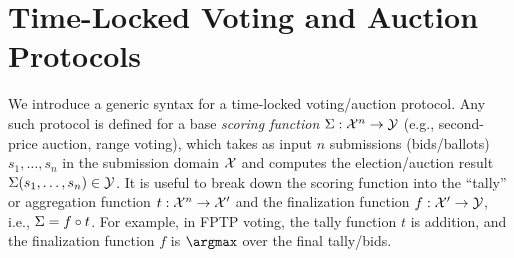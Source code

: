 \section{Time-Locked Voting and Auction Protocols}\label{sec:syntax}

We introduce a generic syntax for a time-locked voting/auction protocol. Any such protocol is defined for a base \emph{scoring function} $\Sigma: \mathcal{X}^n \to \mathcal{Y}$ (e.g., second-price auction, range voting), which takes as input $n$ submissions (bids/ballots) $s_1, \dots, s_n$ in the submission domain $\mathcal{X}$ and computes the election/auction result $\Sigma(s_1, \dots, s_n) \in \mathcal{Y}$. It is useful to break down the scoring function into the ``tally'' or aggregation function $t: \mathcal{X}^n \to \mathcal{X}'$ and the finalization function $f: \mathcal{X}' \to \mathcal{Y}$, i.e., $\Sigma = f \circ t$.
For example, in FPTP voting, the tally function $t$ is addition, and the finalization function $f$ is $\argmax$ over the final tally/bids.

